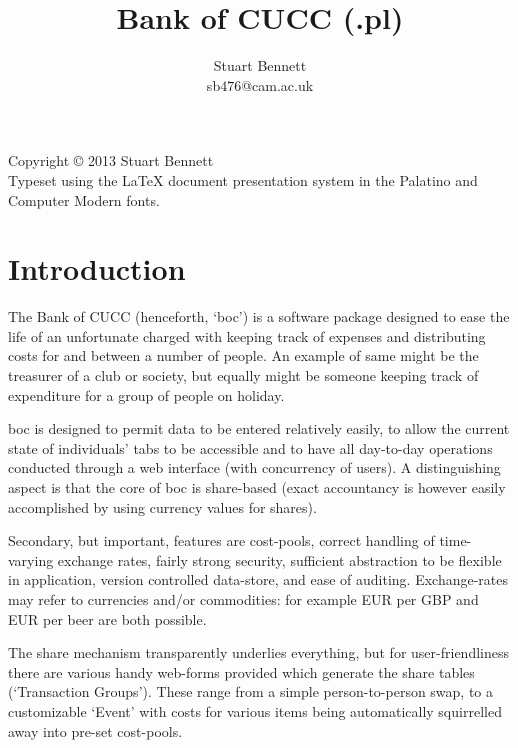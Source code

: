 \documentclass{report}
\begin{document}

\title{Bank of CUCC (.pl)}
\author{Stuart Bennett\\\normalsize{sb$476$@cam.ac.uk}}
\maketitle

\clearpage
\null\vspace{4cm}


Copyright \copyright{} 2013 Stuart Bennett
\vspace{5cm}\\
Typeset using the \LaTeX{} document presentation system in the Palatino and Computer Modern fonts.

\cleardoublepage
{}
\tableofcontents

\chapter{Introduction}

The Bank of CUCC (henceforth, `boc') is a software package designed to ease the life of an unfortunate charged with keeping track of expenses and distributing costs for and between a number of people.  An example of same might be the treasurer of a club or society, but equally might be someone keeping track of expenditure for a group of people on holiday.

boc is designed to permit data to be entered relatively easily, to allow the current state of individuals' tabs to be accessible and to have all day-to-day operations conducted through a web interface (with concurrency of users).  A distinguishing aspect is that the core of boc is share-based (exact accountancy is however easily accomplished by using currency values for shares).

Secondary, but important, features are cost-pools, correct handling of time-varying exchange rates, fairly strong security, sufficient abstraction to be flexible in application, version controlled data-store, and ease of auditing.  Exchange-rates may refer to currencies and/or commodities: for example EUR per GBP and EUR per beer are both possible.

The share mechanism transparently underlies everything, but for user-friendliness there are various handy web-forms provided which generate the share tables (`Transaction Groups').  These range from a simple person-to-person swap, to a customizable `Event' with costs for various items being automatically squirrelled away into pre-set cost-pools.
\end{document}
